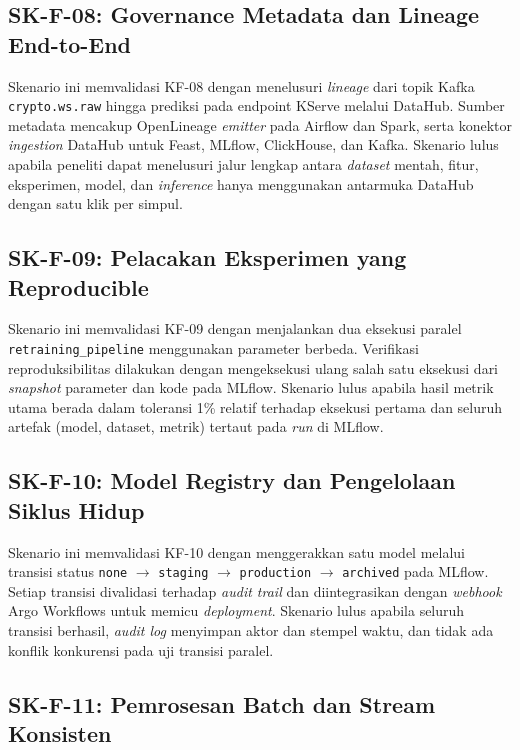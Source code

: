 \subsection{SK-F-08: Governance Metadata dan Lineage End-to-End}

Skenario ini memvalidasi KF-08 dengan menelusuri \textit{lineage} dari topik Kafka \texttt{crypto.ws.raw} hingga prediksi pada endpoint KServe melalui DataHub. Sumber metadata mencakup OpenLineage \textit{emitter} pada Airflow dan Spark, serta konektor \textit{ingestion} DataHub untuk Feast, MLflow, ClickHouse, dan Kafka. Skenario lulus apabila peneliti dapat menelusuri jalur lengkap antara \textit{dataset} mentah, fitur, eksperimen, model, dan \textit{inference} hanya menggunakan antarmuka DataHub dengan satu klik per simpul.

\subsection{SK-F-09: Pelacakan Eksperimen yang Reproducible}

Skenario ini memvalidasi KF-09 dengan menjalankan dua eksekusi paralel \texttt{retraining\_pipeline} menggunakan parameter berbeda. Verifikasi reproduksibilitas dilakukan dengan mengeksekusi ulang salah satu eksekusi dari \textit{snapshot} parameter dan kode pada MLflow. Skenario lulus apabila hasil metrik utama berada dalam toleransi 1\% relatif terhadap eksekusi pertama dan seluruh artefak (model, dataset, metrik) tertaut pada \textit{run} di MLflow.

\subsection{SK-F-10: Model Registry dan Pengelolaan Siklus Hidup}

Skenario ini memvalidasi KF-10 dengan menggerakkan satu model melalui transisi status \texttt{none} $\rightarrow$ \texttt{staging} $\rightarrow$ \texttt{production} $\rightarrow$ \texttt{archived} pada MLflow. Setiap transisi divalidasi terhadap \textit{audit trail} dan diintegrasikan dengan \textit{webhook} Argo Workflows untuk memicu \textit{deployment}. Skenario lulus apabila seluruh transisi berhasil, \textit{audit log} menyimpan aktor dan stempel waktu, dan tidak ada konflik konkurensi pada uji transisi paralel.

\subsection{SK-F-11: Pemrosesan Batch dan Stream Konsisten}

